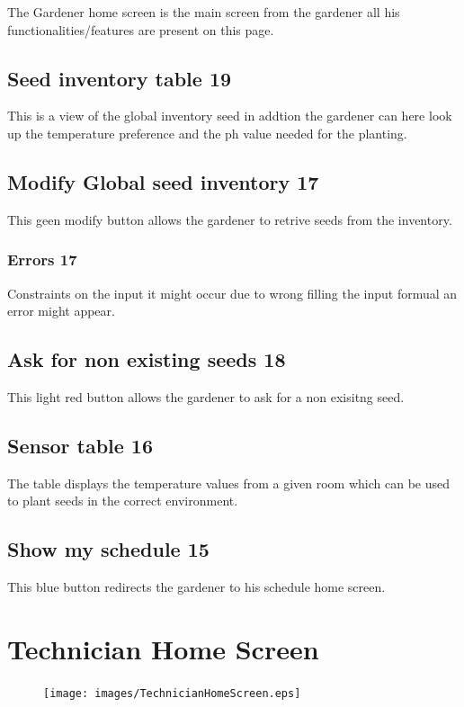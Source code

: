 The Gardener home screen is the main screen from the gardener all his
functionalities/features are present on this page.



\subsection{Seed inventory table 19}
This is a view of the global inventory seed in addtion the gardener can here
look up the temperature preference and the ph value needed for the planting.

\subsection{Modify Global seed inventory 17}
This geen modify button allows the gardener to retrive seeds from the inventory.
\subsubsection{Errors 17}
Constraints on the input it might occur due to wrong filling the input
formual an error might appear.

\subsection{Ask for non existing seeds 18}
This light red button allows the gardener to ask for a non exisitng seed. 


\subsection{Sensor table 16}
The table displays the temperature values from a given room which can be used
to plant seeds in the correct environment.

\subsection{Show my schedule 15 }
This blue button redirects the gardener to his schedule home screen.



\section{Technician Home Screen}
\label{sec:appendix_Technician_Home_Screen}

\begin{figure}[H]
\texttt{[image: images/TechnicianHomeScreen.eps]}
\end{figure}

